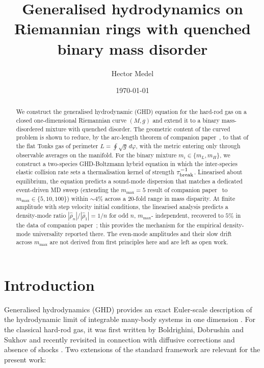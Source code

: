 \documentclass[aps,pre,twocolumn,superscriptaddress,longbibliography,floatfix]{revtex4-2}
\begin{document}
\title{Generalised hydrodynamics on Riemannian rings with quenched
binary mass disorder}

\author{Hector Medel}

\date{\today}

\begin{abstract}
We construct the generalised hydrodynamic (GHD) equation for
the hard-rod gas on a closed one-dimensional Riemannian
curve $(M,g)$ and extend it to a binary mass-disordered mixture
with quenched disorder. The geometric content of the curved
problem is shown to reduce, by the arc-length theorem of
companion paper~\cite{PaperI}, to that of the flat Tonks gas of
perimeter $L=\oint\sqrt{g}\,d\varphi$, with the metric entering
only through observable averages on the manifold. For the
binary mixture $m_i\in\{m_L,m_H\}$, we construct a two-species
GHD-Boltzmann hybrid equation in which the inter-species
elastic collision rate sets a thermalisation kernel of strength
$\tau_{\rm break}^{-1}$. Linearised about equilibrium, the equation predicts a
sound-mode dispersion that matches a dedicated event-driven MD
sweep (extending the $m_{\max}=5$ result of companion
paper~\cite{PaperII} to $m_{\max}\in\{5,10,100\}$) within
$\sim 4\%$ across a 20-fold range in mass disparity. At finite
amplitude with step velocity initial conditions, the linearised
analysis predicts a density-mode ratio
$|\hat\rho_n|/|\hat\rho_1|=1/n$ for odd $n$, $m_{\max}$-%
independent, recovered to $5\%$ in the data of companion
paper~\cite{PaperIII}; this provides the mechanism for the
empirical density-mode universality reported there. The
even-mode amplitudes and their slow drift across $m_{\max}$
are not derived from first principles here and are left as
open work.
\end{abstract}

\maketitle

\section{Introduction}\label{sec:intro}

Generalised hydrodynamics (GHD) provides an exact Euler-scale
description of the hydrodynamic limit of integrable many-body
systems in one dimension
\cite{DoyonSpohn2017,Doyon2017Lectures,BertiniGhdReview2025,
DenardisDoyon2018,Bulchandani2018,GHDperspective2025}. For the
classical hard-rod gas, it was first written by Boldrighini,
Dobrushin and Sukhov \cite{BDS1983} and recently revisited
in connection with diffusive corrections \cite{HRDiffusive2023}
and absence of shocks \cite{HubnerDoyon2024}. Two extensions
of the standard framework are relevant for the present work:
\end{document}
